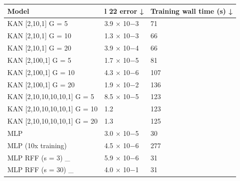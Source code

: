 \begin{tabular}{lll}
\toprule
Model & l 22 error ↓ & Training wall time (s) ↓ \\
\midrule
KAN [2,10,1] G = 5 & 3.9 × 10−3 & 71 \\
KAN [2,10,1] G = 10 & 1.3 × 10−3 & 66 \\
KAN [2,10,1] G = 20 & 3.9 × 10−4 & 66 \\
KAN [2,100,1] G = 5 & 1.7 × 10−5 & 81 \\
KAN [2,100,1] G = 10 & 4.3 × 10−6 & 107 \\
KAN [2,100,1] G = 20 & 1.9 × 10−2 & 136 \\
KAN [2,10,10,10,10,1] G = 5 & 8.5 × 10−5 & 123 \\
KAN [2,10,10,10,10,1] G = 10 & 1.2 & 123 \\
KAN [2,10,10,10,10,1] G = 20 & 1.3 & 125 \\
MLP & 3.0 × 10−5 & 30 \\
MLP (10x training) & 4.5 × 10−6 & 277 \\
MLP RFF (s = 3) \_ & 5.9 × 10−6 & 31 \\
MLP RFF (s = 30) \_ & 4.0 × 10−1 & 31 \\
\bottomrule
\end{tabular}
